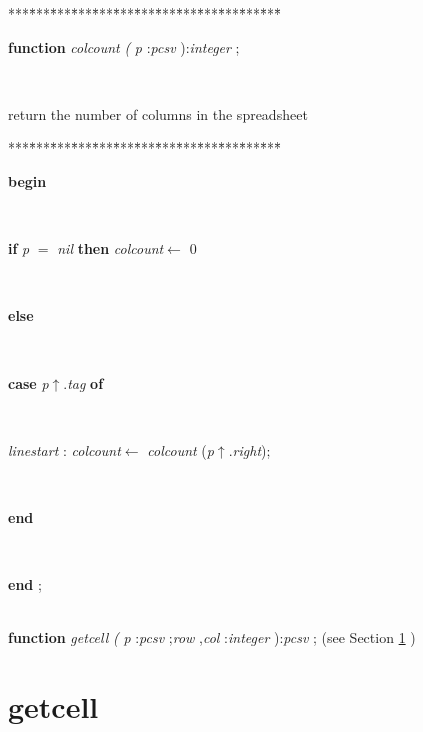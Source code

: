 \begin{tabbing}
***\=***\=***\=***\=***\=***\=***\=***\=***\=***\=***\=***\=***\=\kill
\parbox{14cm}{\textsf{\textbf{function}  \textit{colcount} \textit{(} \textit{p} :\textit{pcsv} ):\textit{integer} ;}}\\
\end{tabbing}
return the number of columns in the spreadsheet
\begin{tabbing}
***\=***\=***\=***\=***\=***\=***\=***\=***\=***\=***\=***\=***\=\kill
\\
\+\parbox{14cm}{\textsf{\textbf{begin} }}\\
\+\parbox{14cm}{\textsf {\textbf {if } \textsf{\textit{p} $=$ \textit{nil}} \textbf{ then } \textsf{\textit{colcount}$\leftarrow$ 0}}}\\
\<\parbox{14cm}{\textsf{\textbf{else} }}\\
\+\parbox{14cm}{\textsf {\textbf {case } \textsf{\textit{p}$\uparrow$.\textit{tag}} \textbf{ of } }}\\
\parbox{14cm}{\textsf{\textit{linestart} : \textit{colcount}$\leftarrow$ \textit{colcount} (\textit{p}$\uparrow$.\textit{right})}; }\\
\<\-\parbox{14cm}{\textsf{\textbf{end} }}\\
\<\-\<\-\parbox{14cm}{\textsf{\textbf{end} ;}}\\
\+\textsf{\textbf{function}  \textit{getcell} \textit{(} \textit{p} :\textit{pcsv} ;\textit{row} ,\textit{col} :\textit{integer} ):\textit{pcsv} ;} (see Section \ref{sec:csvfilereader/getdatamatrix/recursedown/recurse/getcolheaders/recurse/getrowheaders/recurse/colcountgetcell} )\\
\end{tabbing}
\section{getcell}\label{sec:csvfilereader/getdatamatrix/recursedown/recurse/getcolheaders/recurse/getrowheaders/recurse/colcountgetcell}

